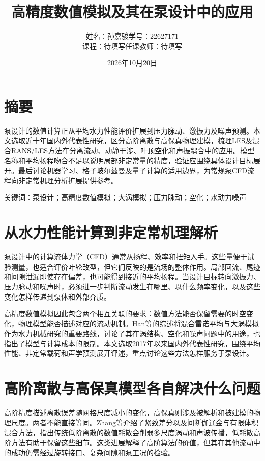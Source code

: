 \documentclass[UTF8,a4paper,zihao=-4,fontset=none,oneside]{ctexart}
\title{高精度数值模拟及其在泵设计中的应用}
\author{姓名：孙嘉骏\quad 学号：22627171\\课程：待填写\quad 任课教师：待填写}
\date{2026年10月20日}
\makeatletter
\providecommand{\songti}{\CJKfamily{zhsong}}
\renewcommand{\maketitle}{%
  \begingroup
    \centering
    {\normalfont\songti\zihao{3}\@title\par}
    \vspace{0.8\baselineskip}
    {\normalfont\songti\zihao{-4}\@author\par}
    \vspace{0.25\baselineskip}
    {\normalfont\songti\zihao{-4}\@date\par}
    \vspace{0.8\baselineskip}
  \endgroup
}
\makeatother
\begin{document}
\maketitle

\section*{摘要}
泵设计的数值计算正从平均水力性能评价扩展到压力脉动、激振力及噪声预测。本文选取近十年国内外代表性研究，区分高阶离散与高保真物理建模，梳理LES及混合RANS/LES方法在分离流动、动静干涉、叶顶空化和声振耦合中的应用。模型名称和平均扬程吻合不足以说明局部非定常量的精度，验证应围绕具体设计目标展开。最后讨论机器学习、格子玻尔兹曼及量子计算的适用边界，为常规泵CFD流程向非定常机理分析扩展提供参考。

\noindent 关键词：泵设计；高精度数值模拟；大涡模拟；压力脉动；空化；水动力噪声


\section{从水力性能计算到非定常机理解析}

泵设计中的计算流体力学（CFD）通常从扬程、效率和扭矩入手。这些量便于试验测量，也适合评价叶轮改型，但它们反映的是流场的整体作用。局部回流、尾迹和间隙泄漏即使存在偏差，也可能得到接近的平均扬程。当设计目标转向激振力、压力脉动和噪声时，必须进一步判断流动发生在哪里、以什么频率变化，以及这些变化怎样传递到泵体和外部介质。

高精度数值模拟因此包含两个相互关联的要求：数值方法能否保留需要的时空变化，物理模型能否描述对应的流动机制。Han等的综述将混合雷诺平均与大涡模拟作为水力机械研究的重要路线，讨论了其在涡结构、空化和噪声问题中的用途，也指出了模型与计算成本的限制\cite{Han2024HybridReview}。本文选取2017年以来国内外代表性研究，围绕平均性能、非定常载荷和声学预测展开评述，重点讨论这些方法怎样服务于泵设计。

\section{高阶离散与高保真模型各自解决什么问题}

高阶精度描述离散误差随网格尺度减小的变化，高保真则涉及被解析和被建模的物理尺度。两者不能直接等同。Zhang等介绍了紧致差分以及间断伽辽金与有限体积混合方法，指出传统低阶离散的数值耗散会削弱多尺度涡动和声波传播，低耗散高阶方法有助于保留这些细节\cite{Zhang2017HighOrder}。这类进展解释了高阶算法的价值，但其在其他流动中的成功仍需经过旋转接口、复杂间隙和泵工况的检验。
\end{document}
